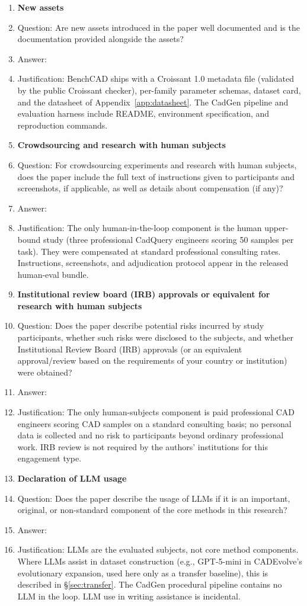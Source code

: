 \documentclass{article}
\begin{document}
\begin{enumerate}
\item {\bf New assets}
    \item[] Question: Are new assets introduced in the paper well documented and is the documentation provided alongside the assets?
    \item[] Answer: \answerYes{}
    \item[] Justification: BenchCAD ships with a Croissant 1.0 metadata file (validated by the public Croissant checker), per-family parameter schemas, dataset card, and the datasheet of Appendix~\ref{app:datasheet}. The CadGen pipeline and evaluation harness include README, environment specification, and reproduction commands.

\item {\bf Crowdsourcing and research with human subjects}
    \item[] Question: For crowdsourcing experiments and research with human subjects, does the paper include the full text of instructions given to participants and screenshots, if applicable, as well as details about compensation (if any)?
    \item[] Answer: \answerYes{}
    \item[] Justification: The only human-in-the-loop component is the human upper-bound study (three professional CadQuery engineers scoring 50 samples per task). They were compensated at standard professional consulting rates. Instructions, screenshots, and adjudication protocol appear in the released human-eval bundle.

\item {\bf Institutional review board (IRB) approvals or equivalent for research with human subjects}
    \item[] Question: Does the paper describe potential risks incurred by study participants, whether such risks were disclosed to the subjects, and whether Institutional Review Board (IRB) approvals (or an equivalent approval/review based on the requirements of your country or institution) were obtained?
    \item[] Answer: \answerNA{}
    \item[] Justification: The only human-subjects component is paid professional CAD engineers scoring CAD samples on a standard consulting basis; no personal data is collected and no risk to participants beyond ordinary professional work. IRB review is not required by the authors' institutions for this engagement type.

\item {\bf Declaration of LLM usage}
    \item[] Question: Does the paper describe the usage of LLMs if it is an important, original, or non-standard component of the core methods in this research?
    \item[] Answer: \answerYes{}
    \item[] Justification: LLMs are the evaluated subjects, not core method components. Where LLMs assist in dataset construction (e.g., GPT-5-mini in CADEvolve's evolutionary expansion, used here only as a transfer baseline), this is described in \S\ref{sec:transfer}. The CadGen procedural pipeline contains no LLM in the loop. LLM use in writing assistance is incidental.

\end{enumerate}
\end{document}
